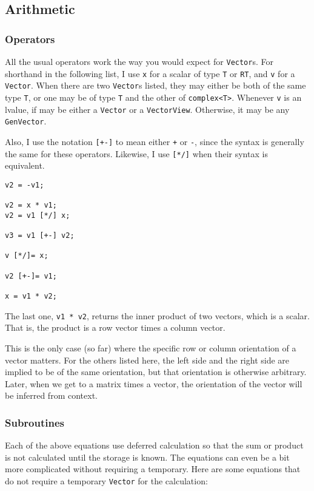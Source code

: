 \documentclass[twoside,letterpaper,11pt]{article}
\renewcommand{\tt}[1]{{\texttt {#1}}}
\begin{document}
\subsection{Arithmetic}

\subsubsection{Operators}

All the usual operators work the way you would expect for \tt{Vector}s.  For shorthand in the 
following list, I use \tt{x} for a scalar of type \tt{T} or \tt{RT}, and
\tt{v} for a \tt{Vector}.  When there are two \tt{Vector}s
listed, they may either be both of the same type \tt{T}, or one may be of type 
\tt{T} and the other of \tt{complex<T>}.  Whenever \tt{v} is an lvalue,
if may be either a \tt{Vector} or a \tt{VectorView}.  Otherwise, it may be any \tt{GenVector}.

Also, I use the notation \tt{[+-]} to mean either \tt{+} or \tt{-}, since
the syntax is generally the same for these operators.
Likewise, I use \tt{[*/]} when their syntax is equivalent.

\begin{verbatim}
v2 = -v1;

v2 = x * v1;
v2 = v1 [*/] x;

v3 = v1 [+-] v2;

v [*/]= x;

v2 [+-]= v1;

x = v1 * v2;
\end{verbatim}
The last one, \tt{v1 * v2},
returns the inner product of two vectors, which is a scalar.  That is, the product
is a row vector times a column vector.  

This is the only case (so far)
where the specific row or column orientation of a vector matters.  For the others
listed here, the left side and the right side are implied to be of the same orientation, but
that orientation is otherwise arbitrary.
Later, when we get to a matrix times a vector, the orientation 
of the vector will be inferred from context.

\subsubsection{Subroutines}

Each of the above equations use deferred calculation so that the sum or product is not calculated
until the storage is known.  The equations can even be a bit more complicated without 
requiring a temporary.  Here are some equations that do not require a temporary 
\tt{Vector} for the calculation:
\end{document}
